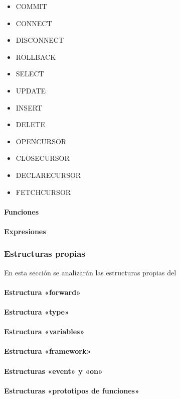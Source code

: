 \begin{itemize}
 \item COMMIT
 \item CONNECT
 \item DISCONNECT
 \item ROLLBACK
 \item SELECT
 \item UPDATE
 \item INSERT
 \item DELETE	
 \item OPENCURSOR
 \item CLOSECURSOR
 \item DECLARECURSOR
 \item FETCHCURSOR
\end{itemize}
 

\paragraph{Funciones}



\paragraph{Expresiones}

\subsubsection{Estructuras propias}

En esta sección se analizarán las estructuras propias del 
\paragraph{Estructura «forward»}
\paragraph{Estructura «type»}
\paragraph{Estructura «variables»}
\paragraph{Estructura «framework»}
\paragraph{Estructuras «event» y «on»}
\paragraph{Estructuras «prototipos de funciones»}

